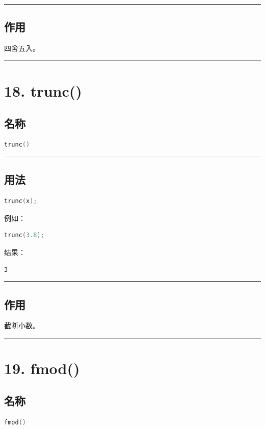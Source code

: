 \documentclass[10pt,twocolumn]{extarticle}
\begin{document}
\noindent\rule{\linewidth}{0.4pt}

\subsection{作用}
四舍五入。

\noindent\rule{\linewidth}{0.4pt}

\section{18. trunc()}

\subsection{名称}
\begin{lstlisting}[language=C++]
trunc()
\end{lstlisting}

\noindent\rule{\linewidth}{0.4pt}

\subsection{用法}
\begin{lstlisting}[language=C++]
trunc(x);
\end{lstlisting}
例如：
\begin{lstlisting}[language=C++]
trunc(3.8);
\end{lstlisting}
结果：
\begin{lstlisting}
3
\end{lstlisting}

\noindent\rule{\linewidth}{0.4pt}

\subsection{作用}
截断小数。

\noindent\rule{\linewidth}{0.4pt}

\section{19. fmod()}

\subsection{名称}
\begin{lstlisting}[language=C++]
fmod()
\end{lstlisting}
\end{document}
